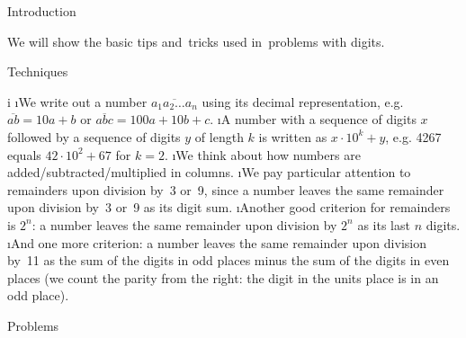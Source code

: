 





\sec Introduction

We will show the basic tips and~tricks used in~problems with digits.

\sec Techniques

\begitems \style i
\i We write out a number $\overline{a_1a_2\dots a_n}$ using its decimal representation, e.g. $\overline{ab}=10a+b$ or $\overline{abc}=100a+10b+c$.
\i A number with a sequence of digits $x$ followed by a sequence of digits $y$ of length $k$ is written as $x \cdot 10^k + y$, e.g. 4267 equals $42 \cdot 10^2 + 67$ for $k=2$.
\i We think about how numbers are added/subtracted/multiplied in columns.
\i We pay particular attention to remainders upon division by~3 or~9, since a number leaves the same remainder upon division by~3 or~9 as its digit sum.
\i Another good criterion for remainders is $2^n$: a number leaves the same remainder upon division by $2^n$ as its last $n$ digits.
\i And one more criterion: a number leaves the same remainder upon division by~11 as the sum of the digits in odd places minus the sum of the digits in even places (we count the parity from the right: the digit in the units place is in an odd place).
\enditems

\sec Problems


